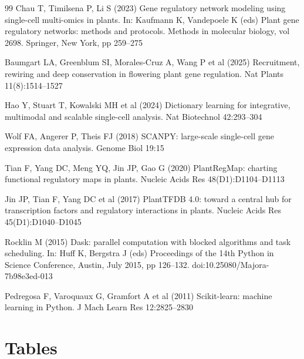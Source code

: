 \documentclass[11pt,a4paper]{article}
\begin{document}
\begin{thebibliography}{99}
 Chau T, Timilsena P, Li S (2023) Gene regulatory network modeling using single-cell multi-omics in plants. In: Kaufmann K, Vandepoele K (eds) Plant gene regulatory networks: methods and protocols. Methods in molecular biology, vol 2698. Springer, New York, pp 259--275

 Baumgart LA, Greenblum SI, Morales-Cruz A, Wang P et al (2025) Recruitment, rewiring and deep conservation in flowering plant gene regulation. Nat Plants 11(8):1514--1527

 Hao Y, Stuart T, Kowalski MH et al (2024) Dictionary learning for integrative, multimodal and scalable single-cell analysis. Nat Biotechnol 42:293--304

 Wolf FA, Angerer P, Theis FJ (2018) SCANPY: large-scale single-cell gene expression data analysis. Genome Biol 19:15

 Tian F, Yang DC, Meng YQ, Jin JP, Gao G (2020) PlantRegMap: charting functional regulatory maps in plants. Nucleic Acids Res 48(D1):D1104--D1113

 Jin JP, Tian F, Yang DC et al (2017) PlantTFDB 4.0: toward a central hub for transcription factors and regulatory interactions in plants. Nucleic Acids Res 45(D1):D1040--D1045

 Rocklin M (2015) Dask: parallel computation with blocked algorithms and task scheduling. In: Huff K, Bergstra J (eds) Proceedings of the 14th Python in Science Conference, Austin, July 2015, pp 126--132. doi:10.25080/Majora-7b98e3ed-013

 Pedregosa F, Varoquaux G, Gramfort A et al (2011) Scikit-learn: machine learning in Python. J Mach Learn Res 12:2825--2830

\end{thebibliography}

\section*{Tables}
\end{document}
